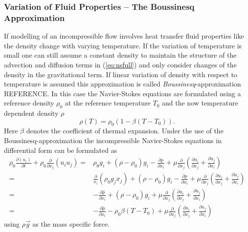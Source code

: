       \subsubsection{Variation of Fluid Properties -- The Boussinesq Approximation}
      \label{sec:boussinesq}

      If modelling of an incompressible flow involves heat transfer fluid properties like the density change with varying temperature. If the variation of temperature is small one can still assume a constant density to maintain the structure of the advection and diffusion terms in (\ref{eq:nsfull}) and only consider changes of the density in the gravitational term. If linear variation of density with respect to temperature is assumed this approximation is called \emph{Boussinesq}-approximation \cite{gray76} REFERENCE. In this case the Navier-Stokes equations are formulated using a reference density \(\rho_0\) at the reference temperature \(T_0\) and the now temperature dependent density \(\rho\)
      \begin{equation}
        \rho \left( T \right) = \rho_0 \left( 1 - \beta \left( T - T_0 \right) \right).
      \end{equation}
      Here \(\beta\) denotes the coefficient of thermal expansion. Under the use of the Boussinesq-approximation the incompressible Navier-Stokes equations in differential form can be formulated as
      \begin{align*}
        \rho_0 \frac{\partial \left( u_i \right)}{\partial t} 
        + \rho_0 \frac{\partial}{\partial x_j} \left( u_i  u_j \right) 
        =& \rho_0 g_i + \left(\rho - \rho_0 \right) g_i
        - \frac{\partial p}{\partial x_i}
        +  \mu \frac{\partial}{\partial x_j} \left( \frac{\partial u_i}{\partial x_j} 
        + \frac{\partial u_j}{\partial x_i} \right)  \\[0.5em]
        =& \frac{\partial}{x_i}\left(\rho_0 g_j x_j \right) 
        + \left(\rho - \rho_0 \right) g_i
        - \frac{\partial p}{\partial x_i}
        +  \mu \frac{\partial}{\partial x_j} \left( \frac{\partial u_i}{\partial x_j} 
        + \frac{\partial u_j}{\partial x_i} \right)  \\[0.5em]
        =& - \frac{\partial \hat{p}}{\partial x_i} 
        + \left(\rho - \rho_0 \right) g_i
        +  \mu \frac{\partial}{\partial x_j} \left( \frac{\partial u_i}{\partial x_j} 
        + \frac{\partial u_j}{\partial x_i} \right)  \\[0.5em]
        =& - \frac{\partial \hat{p}}{\partial x_i} 
        - \rho_0 \beta \left( T - T_0 \right)
        +  \mu \frac{\partial}{\partial x_j} \left( \frac{\partial u_i}{\partial x_j} 
                                             + \frac{\partial u_j}{\partial x_i} \right) 
      \end{align*}
      using \(\rho \vec{g}\) as the mass specific force. 

